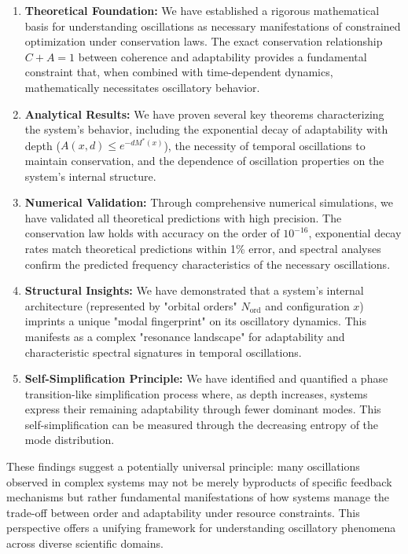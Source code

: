 \documentclass[11pt,a4paper]{article}
\begin{document}
\begin{enumerate}
    \item \textbf{Theoretical Foundation:} We have established a rigorous mathematical basis for understanding oscillations as necessary manifestations of constrained optimization under conservation laws. The exact conservation relationship $C+A=1$ between coherence and adaptability provides a fundamental constraint that, when combined with time-dependent dynamics, mathematically necessitates oscillatory behavior.

    \item \textbf{Analytical Results:} We have proven several key theorems characterizing the system's behavior, including the exponential decay of adaptability with depth ($A(x,d) \leq e^{-d M^*(x)}$), the necessity of temporal oscillations to maintain conservation, and the dependence of oscillation properties on the system's internal structure.

    \item \textbf{Numerical Validation:} Through comprehensive numerical simulations, we have validated all theoretical predictions with high precision. The conservation law holds with accuracy on the order of $10^{-16}$, exponential decay rates match theoretical predictions within 1\% error, and spectral analyses confirm the predicted frequency characteristics of the necessary oscillations.

    \item \textbf{Structural Insights:} We have demonstrated that a system's internal architecture (represented by "orbital orders" $N_{\text{ord}}$ and configuration $x$) imprints a unique "modal fingerprint" on its oscillatory dynamics. This manifests as a complex "resonance landscape" for adaptability and characteristic spectral signatures in temporal oscillations.

    \item \textbf{Self-Simplification Principle:} We have identified and quantified a phase transition-like simplification process where, as depth increases, systems express their remaining adaptability through fewer dominant modes. This self-simplification can be measured through the decreasing entropy of the mode distribution.
\end{enumerate}

These findings suggest a potentially universal principle: many oscillations observed in complex systems may not be merely byproducts of specific feedback mechanisms but rather fundamental manifestations of how systems manage the trade-off between order and adaptability under resource constraints. This perspective offers a unifying framework for understanding oscillatory phenomena across diverse scientific domains.
\end{document}
